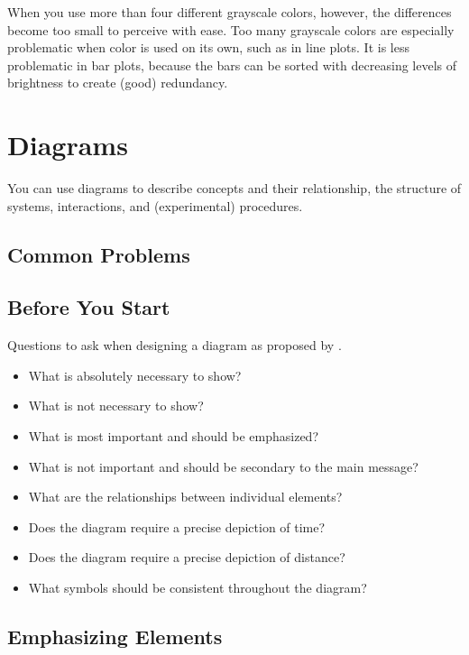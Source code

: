 When you use more than four different grayscale colors, however, the differences become too small to perceive with ease. Too many grayscale colors are especially problematic when color is used on its own, such as in line plots. It is less problematic in bar plots, because the bars can be sorted with decreasing levels of brightness to create (good) redundancy.


\section{Diagrams}

You can use diagrams to describe concepts and their relationship, the structure of systems, interactions, and (experimental) procedures.

\subsection{Common Problems}



\subsection{Before You Start}

Questions to ask when designing a diagram as proposed by \cite{Carter12}.
\begin{itemize}
\item What is absolutely necessary to show?
\item What is not necessary to show?
\item What is most important and should be emphasized?
\item What is not important and should be secondary to the main message?
\item What are the relationships between individual elements?
\item Does the diagram require a precise depiction of time?
\item Does the diagram require a precise depiction of distance?
\item What symbols should be consistent throughout the diagram?
\end{itemize}


\subsection{Emphasizing Elements}

